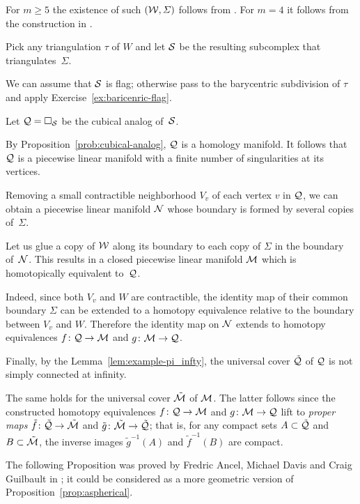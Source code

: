 For $m\ge 5$ the existence of such $(\mathcal{W}, \varSigma)$ follows from \cite{kervaire}. 
For $m=4$ it follows from the construction in \cite{mazur}.

Pick any triangulation $\tau$ of $W$ and let $\mathcal{S}$ be the resulting subcomplex that triangulates~$\Sigma$.


We can assume that $\mathcal{S}$ is flag; 
otherwise pass to the barycentric subdivision 
of $\tau$ and apply Exercise~\ref{ex:baricenric-flag}.


Let $\mathcal{Q}=\square_{\mathcal{S}}$ be the cubical analog of~$\mathcal{S}$.

By Proposition~\ref{prob:cubical-analog},
$\mathcal{Q}$ is a homology manifold.
It follows that $\mathcal{Q}$ is a piecewise linear manifold 
with a finite number of singularities at its vertices.


Removing a small contractible neighborhood $V_v$ of each vertex $v$ in $\mathcal{Q}$,
we can obtain a piecewise linear manifold $\mathcal{N}$
whose boundary is formed by several copies of~$\Sigma$.

Let us glue a copy of  $\mathcal{W}$ along its boundary to each copy of $\Sigma$ in the boundary of~$\mathcal{N}$.
This results in a  closed piecewise linear manifold 
$\mathcal{M}$ which is homotopically equivalent to~$\mathcal{Q}$.

Indeed, since both $V_v$ and $W$ are contractible, the identity map of  their common boundary $\Sigma$ can be extended to a homotopy equivalence relative to the boundary between $V_v$ and $W$.
Therefore the identity map on $\mathcal{N}$ extends to homotopy equivalences 
$f\: \spc Q\to \spc M$ and $g\:\spc M\to \spc Q$.

Finally, by the Lemma~\ref{lem:example-pi_infty},  
the universal cover $\tilde{\mathcal{Q}}$ of $\mathcal{Q}$
is not simply connected at infinity.

The same holds for 
the universal cover $\tilde{\mathcal{M}}$ of $\mathcal{M}$.
The latter follows since the constructed homotopy equivalences 
$f\: \spc Q\to \spc M$ and $g\:\spc M\to \spc Q$ 
lift to {}\emph{proper maps} 
$\tilde f \: \tilde{\spc{Q}}\to \tilde{\spc{M}}$
and $\tilde g \: \tilde{\spc{M}}\to \tilde{\spc{Q}}$;
that is, for any compact sets $A\subset \tilde{\spc{Q}}$ and $B\subset\tilde{\spc{M}}$, the inverse images $\tilde g^{-1}(A)$ and $\tilde f^{-1}(B)$ are compact.
\qeds


The following Proposition was proved by Fredric Ancel, 
Michael Davis and Craig Guilbault in \cite{ADG};
it could be considered as a more geometric version of Proposition~\ref{prop:aspherical}.


